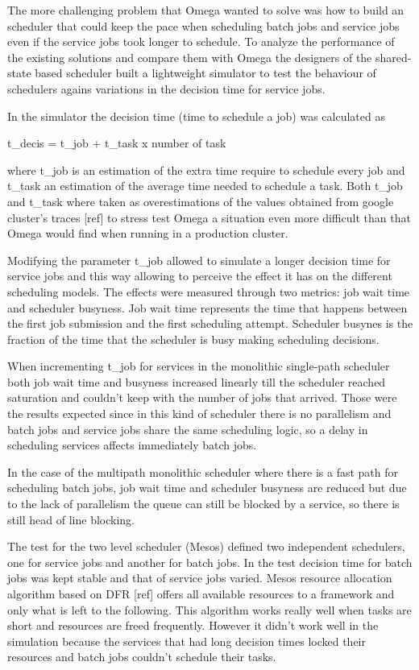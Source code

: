 \documentclass{svjour3}                     %
\begin{document}
The more challenging problem that Omega wanted to solve was how
to build an scheduler that could keep the pace when scheduling batch
jobs and service jobs even if the service jobs took longer to
schedule. To analyze the performance of the existing solutions and
compare them with Omega the designers of the shared-state based
scheduler built a lightweight simulator to test the behaviour of
schedulers agains variations in the decision time for service jobs.

In the simulator the decision time (time to schedule a job) was
calculated as

t\_{decis} = t\_{job} + t\_{task} x number of task

where t\_{job} is an estimation of the extra time require to schedule
every job and t\_{task} an estimation of the average time needed to
schedule a task. Both t\_{job} and t\_{task} where taken as
overestimations of the values obtained from google cluster's traces
[ref] to stress test Omega a situation even more difficult than that
Omega would find when running in a production cluster.

Modifying the parameter t\_{job} allowed to simulate a longer decision
time for service jobs and this way allowing to perceive the effect it
has on the different scheduling models. The effects were measured
through two metrics: job wait time and scheduler busyness. Job wait
time represents the time that happens between the first job submission
and the first scheduling attempt. Scheduler busynes is the fraction of
the time that the scheduler is busy making scheduling decisions.

When incrementing t\_{job} for services in the monolithic single-path
scheduler both job wait time and busyness increased linearly till the
scheduler reached saturation and couldn't keep with the number of jobs
that arrived. Those were the results expected since in this kind of
scheduler there is no parallelism and batch jobs and service jobs share
the same scheduling logic, so a delay in scheduling services affects
immediately batch jobs.

In the case of the multipath monolithic scheduler where there is
a fast path for scheduling batch jobs, job wait time and scheduler
busyness are reduced but due to the lack of parallelism the queue can
still be blocked by a service, so there is still head of line blocking.

The test for the two level scheduler (Mesos) defined two independent
schedulers, one for service jobs and another for batch jobs. In the
test decision time for batch jobs was kept stable and that of service
jobs varied. Mesos resource allocation algorithm based on DFR [ref]
offers all available resources to a framework and only what is left to
the following. This algorithm works really well when tasks are short
and resources are freed frequently. However it didn't work well in the
simulation because the services that had long decision times locked
their resources and batch jobs couldn't schedule their tasks.
\end{document}
